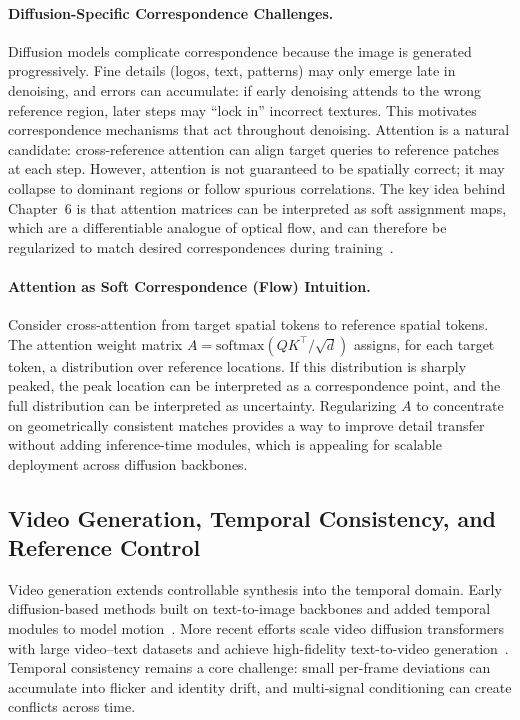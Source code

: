 \paragraph{Diffusion-Specific Correspondence Challenges.}
Diffusion models complicate correspondence because the image is generated progressively. Fine details (logos, text, patterns) may only emerge late in denoising, and errors can accumulate: if early denoising attends to the wrong reference region, later steps may ``lock in'' incorrect textures. This motivates correspondence mechanisms that act throughout denoising. Attention is a natural candidate: cross-reference attention can align target queries to reference patches at each step. However, attention is not guaranteed to be spatially correct; it may collapse to dominant regions or follow spurious correlations. The key idea behind Chapter~6 is that attention matrices can be interpreted as soft assignment maps, which are a differentiable analogue of optical flow, and can therefore be regularized to match desired correspondences during training~\citep{zhou2025learning}.

\paragraph{Attention as Soft Correspondence (Flow) Intuition.}
Consider cross-attention from target spatial tokens to reference spatial tokens. The attention weight matrix $A=\mathrm{softmax}(QK^\top/\sqrt{d})$ assigns, for each target token, a distribution over reference locations. If this distribution is sharply peaked, the peak location can be interpreted as a correspondence point, and the full distribution can be interpreted as uncertainty. Regularizing $A$ to concentrate on geometrically consistent matches provides a way to improve detail transfer without adding inference-time modules, which is appealing for scalable deployment across diffusion backbones.

\subsection{Video Generation, Temporal Consistency, and Reference Control}
Video generation extends controllable synthesis into the temporal domain. Early diffusion-based methods built on text-to-image backbones and added temporal modules to model motion~\citep{blattmann2023stable, guo2023animatediff, chen2024gentron}. More recent efforts scale video diffusion transformers with large video--text datasets and achieve high-fidelity text-to-video generation~\citep{peebles2023scalable, chen2024panda, yang2024cogvideox, kong2024hunyuanvideo, wan2025wan}. Temporal consistency remains a core challenge: small per-frame deviations can accumulate into flicker and identity drift, and multi-signal conditioning can create conflicts across time.

